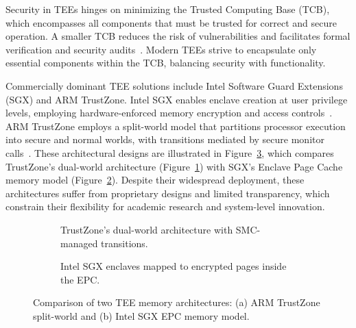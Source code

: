 Security in TEEs hinges on minimizing the Trusted Computing Base (TCB), which encompasses all components that must be trusted for correct and secure operation. A smaller TCB reduces the risk of vulnerabilities and facilitates formal verification and security audits~\cite{Lee2019,Survey2023}. Modern TEEs strive to encapsulate only essential components within the TCB, balancing security with functionality.

Commercially dominant TEE solutions include Intel Software Guard Extensions (SGX) and ARM TrustZone. Intel SGX enables enclave creation at user privilege levels, employing hardware-enforced memory encryption and access controls~\cite{costan2016intel}. ARM TrustZone employs a split-world model that partitions processor execution into secure and normal worlds, with transitions mediated by secure monitor calls~\cite{yan2018trustzone}. These architectural designs are illustrated in Figure~\ref{fig:tee-architectures}, which compares TrustZone's dual-world architecture (Figure~\ref{fig:trustzone}) with SGX's Enclave Page Cache memory model (Figure~\ref{fig:sgx-epc}). Despite their widespread deployment, these architectures suffer from proprietary designs and limited transparency, which constrain their flexibility for academic research and system-level innovation.

\begin{figure}[htbp]
\centering
\begin{subfigure}[b]{0.48\linewidth}
  \centering
  \caption{TrustZone's dual-world architecture with SMC-managed transitions.}
  \label{fig:trustzone}
\end{subfigure}
\hfill
\begin{subfigure}[b]{0.48\linewidth}
  \centering
  \caption{Intel SGX enclaves mapped to encrypted pages inside the EPC.}
  \label{fig:sgx-epc}
\end{subfigure}
\caption{Comparison of two TEE memory architectures: (a) ARM TrustZone split-world and (b) Intel SGX EPC memory model.}
\label{fig:tee-architectures}
\end{figure}

